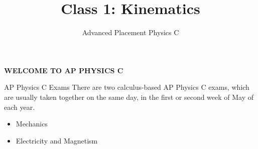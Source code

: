 \documentclass[12pt,compress,aspectratio=169,dvipsnames]{beamer}
\title{Class 1: Kinematics}
\subtitle{Advanced Placement Physics C}
\begin{document}
\begin{frame}
  \centering\Large
  \textbf{WELCOME TO AP PHYSICS C}
\end{frame}






\begin{frame}{AP Physics C Exams}
  There are two calculus-based AP Physics C exams, which are usually taken
  together on the same day, in the first or second week of May of each year.
  \begin{itemize}
  \item Mechanics
  \item Electricity and Magnetism
  \end{itemize}
\end{frame}



\begin{frame}
  \titlepage
\end{frame}
\end{document}
